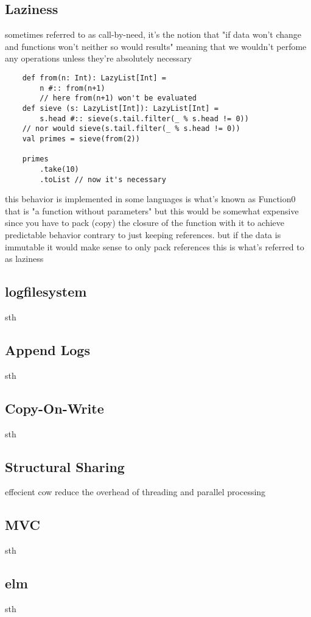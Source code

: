 \documentclass[conference]{IEEEtran}
\begin{document}
\subsection{Laziness}
sometimes referred to as call-by-need, it's the notion that "if data won't change and functions won't neither so would results" meaning that we wouldn't perfome any operations unless they're absolutely necessary 
\lstset{style=scala}
\begin{lstlisting}
    def from(n: Int): LazyList[Int] = 
        n #:: from(n+1) 
        // here from(n+1) won't be evaluated
    def sieve (s: LazyList[Int]): LazyList[Int] = 
        s.head #:: sieve(s.tail.filter(_ % s.head != 0)) 
    // nor would sieve(s.tail.filter(_ % s.head != 0))
    val primes = sieve(from(2))

    primes
        .take(10)
        .toList // now it's necessary

\end{lstlisting}
this behavior is implemented in some languages is what's known as Function0 that is "a function without parameters" but this would be somewhat expensive since you have to pack (copy) the closure
of the function with it to achieve predictable behavior contrary to just keeping references. but if the data is immutable it would make sense to only pack references this is what's referred to as laziness 


\subsection{logfilesystem}
sth
\subsection{Append Logs}
sth
\subsection{Copy-On-Write}
sth
\subsection{Structural Sharing}
effecient cow reduce the overhead of threading and parallel processing
\subsection{MVC}
sth
\subsection{elm}
sth
\end{document}
